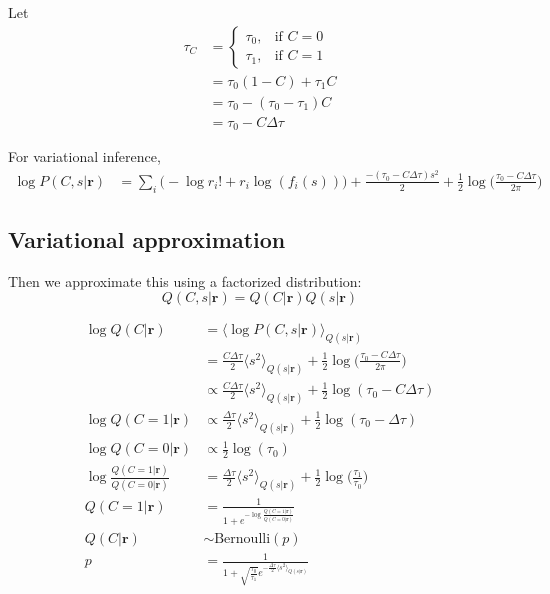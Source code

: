 \documentclass[12pt]{article}
\begin{document}
Let 
\begin{equation}
\begin{aligned}
\tau_C &= \begin{cases}
\tau_0, & \text{if } C = 0\\
\tau_1, & \text{if } C = 1
\end{cases}\\
&= \tau_0 (1 - C) + \tau_1 C\\
&= \tau_0 - (\tau_0 - \tau_1)C\\
&= \tau_0 - C \Delta \tau
\end{aligned}
\end{equation}

For variational inference,
\begin{equation}
\begin{aligned}
\log P(C, s|\mathbf{r}) &= \sum_i \Big(- \log r_i! + r_i \log(f_i(s)) \Big) + \frac{-(\tau_0 - C \Delta \tau) s^2}{2} + \frac{1}{2} \log \Big(\frac{\tau_0 - C \Delta \tau}{2 \pi} \Big)
\end{aligned}
\end{equation}

\subsection{Variational approximation}
Then we approximate this using a factorized distribution:
\begin{equation}
Q(C, s|\mathbf{r}) = Q(C|\mathbf{r}) Q(s|\mathbf{r})
\end{equation}

\begin{equation}
\begin{aligned}
\log Q(C|\mathbf{r}) &= \langle \log P(C, s|\mathbf{r}) \rangle_{Q(s|\mathbf{r})}\\
&= \frac{C \Delta \tau}{2} \langle s^2 \rangle_{Q(s|\mathbf{r})} + \frac{1}{2} \log \Big(\frac{\tau_0 - C \Delta \tau}{2 \pi} \Big)\\
&\propto \frac{C \Delta \tau}{2} \langle s^2 \rangle_{Q(s|\mathbf{r})} + \frac{1}{2} \log (\tau_0 - C \Delta \tau)\\
\log Q(C = 1|\mathbf{r}) &\propto \frac{\Delta \tau}{2} \langle s^2 \rangle_{Q(s|\mathbf{r})} + \frac{1}{2} \log (\tau_0 - \Delta \tau)\\
\log Q(C = 0|\mathbf{r}) &\propto \frac{1}{2} \log (\tau_0)\\
\log \frac{Q(C = 1|\mathbf{r})}{Q(C = 0|\mathbf{r})} &= \frac{\Delta \tau}{2} \langle s^2 \rangle_{Q(s|\mathbf{r})} + \frac{1}{2} \log \Big( \frac{\tau_1}{\tau_0} \Big)\\
Q(C = 1|\mathbf{r}) &= \frac{1}{1 + e^{-\log \frac{Q(C = 1|\mathbf{r})}{Q(C = 0|\mathbf{r})}}}\\
Q(C|\mathbf{r}) & \sim \text{Bernoulli}(p)\\
p &= \frac{1}{1 + \sqrt{\frac{\tau_0}{\tau_1}} e^{- \frac{\Delta \tau}{2} \langle s^2 \rangle_{Q(s|\mathbf{r})}}}
\end{aligned}
\end{equation}
\end{document}

